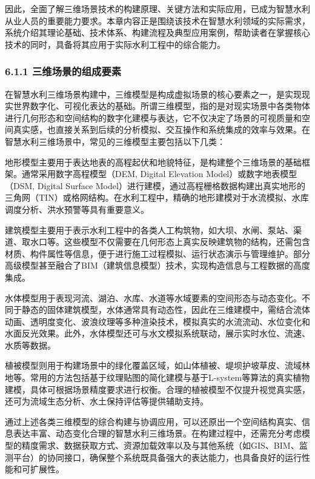 因此，全面了解三维场景技术的构建原理、关键方法和实际应用，已成为智慧水利从业人员的重要能力要求。本章内容正是围绕该技术在智慧水利领域的实际需求，系统介绍其理论基础、技术体系、构建流程及典型应用案例，帮助读者在掌握核心技术的同时，具备将其应用于实际水利工程中的综合能力。

\hypertarget{ux4e09ux7ef4ux573aux666fux7684ux7ec4ux6210ux8981ux7d20}{%
\subsubsection{6.1.1 三维场景的组成要素}\label{ux4e09ux7ef4ux573aux666fux7684ux7ec4ux6210ux8981ux7d20}}

在智慧水利三维场景构建中，三维模型是构成虚拟场景的核心要素之一，是实现现实世界数字化、可视化表达的基础。所谓三维模型，指的是对现实场景中各类物体进行几何形态和空间结构的数字化建模与表达，它不仅决定了场景的可视质量和空间真实感，也直接关系到后续的分析模拟、交互操作和系统集成的效率与效果。在智慧水利三维场景中，常见的三维模型主要包括以下几类：

地形模型主要用于表达地表的高程起伏和地貌特征，是构建整个三维场景的基础框架。通常采用数字高程模型（DEM, Digital Elevation Model）或数字地表模型（DSM, Digital Surface Model）进行建模，通过高程栅格数据构建出真实地形的三角网（TIN）或格网结构。在水利工程中，精确的地形建模对于水流模拟、水库调度分析、洪水预警等具有重要意义。

建筑模型主要用于表示水利工程中的各类人工构筑物，如大坝、水闸、泵站、渠道、取水口等。这些模型不仅需要在几何形态上真实反映建筑物的结构，还需包含材质、构件属性等信息，便于进行施工过程模拟、运行状态演示与管理维护。部分高级模型甚至融合了BIM（建筑信息模型）技术，实现构造信息与工程数据的高度集成。

水体模型用于表现河流、湖泊、水库、水道等水域要素的空间形态与动态变化。不同于静态的固体建筑模型，水体通常具有动态性，因此在三维建模中，需结合流体动画、透明度变化、波浪纹理等多种渲染技术，模拟真实的水流流动、水位变化和水面反光效果。此外，水体模型还可与水文模拟系统联动，展示实时水位、流速、水质等数据。

植被模型则用于构建场景中的绿化覆盖区域，如山体植被、堤坝护坡草皮、流域林地等。常用的方法包括基于纹理贴图的简化建模与基于L-system等算法的真实植物建模，具体可根据场景精度要求进行权衡。合理的植被模型不仅提升视觉真实感，还可为流域生态分析、水土保持评估等提供辅助支持。

通过上述各类三维模型的综合构建与协调应用，可以还原出一个空间结构真实、信息表达丰富、动态变化合理的智慧水利三维场景。在构建过程中，还需充分考虑模型的精度需求、数据获取方式、资源加载效率以及与其他系统（如GIS、BIM、监测平台）的协同接口，确保整个系统既具备强大的表达能力，也具备良好的运行性能和可扩展性。

